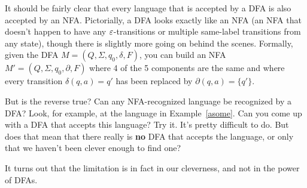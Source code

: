 It should be fairly clear that every language that is accepted by a DFA is also
accepted by an NFA.  Pictorially, a DFA looks exactly like an NFA (an NFA that
doesn't happen to have any $\varepsilon$-transitions or multiple same-label
transitions from any state), though there is slightly more going on behind
the scenes.  Formally, given the DFA $M=(Q, \Sigma, q_0, \delta, F)$, you can
build an NFA $M'=(Q, \Sigma, q_0, \partial, F)$ where 4 of the 5 components
are the same and where every transition $\delta(q,a) = q'$ has been replaced by
$\partial(q,a) = \{q'\}$. 

But is the reverse true?  Can any NFA-recognized language be recognized by a DFA?
Look, for example, at the language in Example~\ref{asome}.  Can you come up with
a DFA that accepts this language?  Try it.  It's pretty difficult to do.  But
does that mean that there really is {\bf no} DFA that accepts the language, or
only that we haven't been clever enough to find one?

It turns out that the limitation is in fact in our cleverness, and not in the
power of DFAs.

